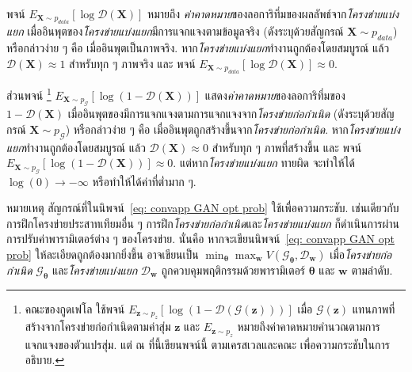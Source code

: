 พจน์ $E_{\bm{X} \sim p_{data}}[\log \mathcal{D}(\bm{X})]$
หมายถึง \textit{ค่าคาดหมาย}ของลอการิทึ่มของผลลัพธ์จาก\textit{โครงข่ายแบ่งแยก} เมื่ออินพุตของ\textit{โครงข่ายแบ่งแยก}มีการแจกแจงตามข้อมูลจริง (ดังระบุด้วยสัญกรณ์ $\bm{X} \sim p_{data}$)
หรือกล่าวง่าย ๆ คือ เมื่ออินพุตเป็นภาพจริง.
หาก\textit{โครงข่ายแบ่งแยก}ทำงานถูกต้องโดยสมบูรณ์ แล้ว $\mathcal{D}(\bm{X}) \approx 1$ สำหรับทุก ๆ ภาพจริง 
และ พจน์ $E_{\bm{X} \sim p_{data}}[\log \mathcal{D}(\bm{X})] \approx 0$.

ส่วนพจน์%
\footnote{%
คณะของกูดเฟโล\cite{GoodfellowEtAl2014a} ใช้พจน์ 
$E_{\bm{z} \sim p_z}[\log(1 - \mathcal{D}(\mathcal{G}(\bm{z})))]$
เมื่อ $\mathcal{G}(\bm{z})$ แทนภาพที่สร้างจากโครงข่ายก่อกำเนิดตามค่าสุ่ม $\bm{z}$ 
และ $E_{\bm{z} \sim p_z}$ หมายถึงค่าคาดหมายคำนวณตามการแจกแจงของตัวแปรสุ่ม.
แต่ ณ ที่นี้เขียนพจน์นี้ ตามเครสเวลและคณะ\cite{OverviewGAN2018}	
เพื่อความกระชับในการอธิบาย.
} 
%
$E_{\bm{X} \sim p_{\mathcal{G}}}[\log(1 - \mathcal{D}(\bm{X}))]$
แสดง\textit{ค่าคาดหมาย}ของลอการิทึ่มของ $1 - \mathcal{D}(\bm{X})$
เมื่ออินพุตของมีการแจกแจงตามการแจกแจงจาก\textit{โครงข่ายก่อกำเนิด}
(ดังระบุด้วยสัญกรณ์ $\bm{X} \sim p_{\mathcal{G}}$)
หรือกล่าวง่าย ๆ คือ เมื่ออินพุตถูกสร้างขึ้นจาก\textit{โครงข่ายก่อกำเนิด}.
หาก\textit{โครงข่ายแบ่งแยก}ทำงานถูกต้องโดยสมบูรณ์ แล้ว $\mathcal{D}(\bm{X}) \approx 0$ สำหรับทุก ๆ ภาพที่สร้างขึ้น 
และ พจน์ $E_{\bm{X} \sim p_{\mathcal{G}}}[\log(1 - \mathcal{D}(\bm{X}))] \approx 0$.
แต่หาก\textit{โครงข่ายแบ่งแยก} ทายผิด จะทำให้ได้ $\log(0) \rightarrow -\infty$ หรือทำให้ได้ค่าที่ต่ำมาก ๆ.

หมายเหตุ สัญกรณ์ที่ในนิพจน์~\ref{eq: convapp GAN opt prob} ใช้เพื่อความกระชับ.
เช่นเดียวกับการฝึกโครงข่ายประสาทเทียมอื่น ๆ 
การฝึก\textit{โครงข่ายก่อกำเนิด}และ\textit{โครงข่ายแบ่งแยก} ก็ดำเนินการผ่านการปรับค่าพารามิเตอร์ต่าง ๆ ของโครงข่าย.
นั่นคือ หากจะเขียนนิพจน์~\ref{eq: convapp GAN opt prob} ให้ละเอียดถูกต้องมากยิ่งขึ้น อาจเขียนเป็น
$\min_{\bm{\theta}} \max_{\bm{w}} V(\mathcal{G}_{\bm{\theta}}, \mathcal{D}_{\bm{w}})$
เมื่อ\textit{โครงข่ายก่อกำเนิด} $\mathcal{G}_{\bm{\theta}}$ 
และ\textit{โครงข่ายแบ่งแยก} $\mathcal{D}_{\bm{w}}$
ถูกควบคุมพฤติกรรมด้วยพารามิเตอร์ $\bm{\theta}$ และ $\bm{w}$ ตามลำดับ.


